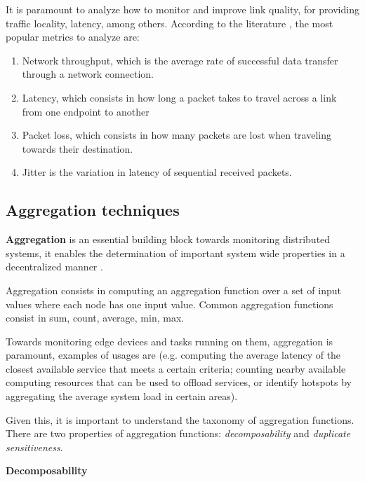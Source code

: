 It is paramount to analyze how to monitor and improve link quality, for providing traffic locality, latency, among others. According to the literature \cite{}, the most popular metrics to analyze are:

\begin{enumerate}

    \item Network throughput, which is the average rate of successful data transfer through a network connection.
    
    \item Latency, which consists in how long a packet takes to travel across a link from one endpoint to another
    
    \item Packet loss, which consists in how many packets are lost when traveling towards their destination.
    
    \item Jitter is the variation in latency of sequential received packets. 
\end{enumerate}

\subsection{Aggregation techniques}

\textbf{Aggregation} is an essential building block towards monitoring distributed systems, it enables the determination of important system wide properties in a decentralized manner \cite{DBLP:journals/corr/abs-1110-0725}. 

Aggregation consists in computing an aggregation function over a set of input values where each node has one input value. Common aggregation functions consist in sum, count, average, min, max.

Towards monitoring edge devices and tasks running on them, aggregation is paramount, examples of usages are (e.g. computing the average latency of the closest available  service that meets a certain criteria; counting nearby available computing resources that can be used to offload services, or identify hotspots by aggregating the average system load in certain areas).

Given this, it is important to understand the taxonomy of aggregation functions. There are two properties of aggregation functions: \textit{decomposability} and \textit{duplicate sensitiveness}.

\textbf{Decomposability}


